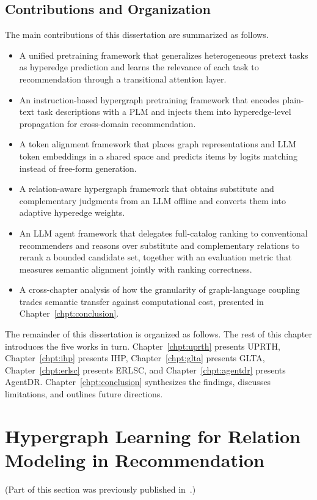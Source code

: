 \subsection{Contributions and Organization}

The main contributions of this dissertation are summarized as follows.

\begin{itemize}[leftmargin=*, itemsep=0.2em, topsep=0.4em]
\item A unified pretraining framework that generalizes heterogeneous pretext tasks as hyperedge prediction and learns the relevance of each task to recommendation through a transitional attention layer.
\item An instruction-based hypergraph pretraining framework that encodes plain-text task descriptions with a PLM and injects them into hyperedge-level propagation for cross-domain recommendation.
\item A token alignment framework that places graph representations and LLM token embeddings in a shared space and predicts items by logits matching instead of free-form generation.
\item A relation-aware hypergraph framework that obtains substitute and complementary judgments from an LLM offline and converts them into adaptive hyperedge weights.
\item An LLM agent framework that delegates full-catalog ranking to conventional recommenders and reasons over substitute and complementary relations to rerank a bounded candidate set, together with an evaluation metric that measures semantic alignment jointly with ranking correctness.
\item A cross-chapter analysis of how the granularity of graph-language coupling trades semantic transfer against computational cost, presented in Chapter~\ref{chpt:conclusion}.
\end{itemize}

The remainder of this dissertation is organized as follows. The rest of this chapter introduces the five works in turn. Chapter~\ref{chpt:uprth} presents UPRTH, Chapter~\ref{chpt:ihp} presents IHP, Chapter~\ref{chpt:glta} presents GLTA, Chapter~\ref{chpt:erlsc} presents ERLSC, and Chapter~\ref{chpt:agentdr} presents AgentDR. Chapter~\ref{chpt:conclusion} synthesizes the findings, discusses limitations, and outlines future directions.

\section{Hypergraph Learning for Relation Modeling in Recommendation}
(Part of this section was previously published in~\cite{uprth}.)

